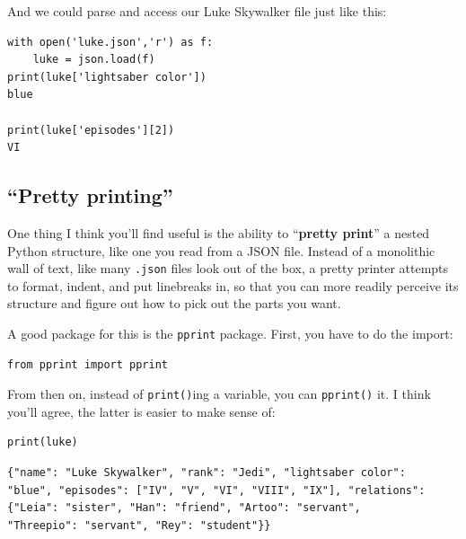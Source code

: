 And we could parse and access our Luke Skywalker file just like this:

\begin{Verbatim}[fontsize=\small,samepage=true,frame=single,framesep=3mm]
with open('luke.json','r') as f:
    luke = json.load(f)
print(luke['lightsaber color'])
blue

print(luke['episodes'][2])
VI
\end{Verbatim}

\normalsize

\subsection{``Pretty printing''}


One thing I think you'll find useful is the ability to ``\textbf{pretty
print}'' a nested Python structure, like one you read from a JSON file. Instead
of a monolithic wall of text, like many \texttt{.json} files look out of the
box, a pretty printer attempts to format, indent, and put linebreaks in, so
that you can more readily perceive its structure and figure out how to pick out
the parts you want.

A good package for this is the \texttt{pprint} package. First, you have to do
the import:


\vspace{-.15in}
\begin{Verbatim}[fontsize=\small,samepage=true,frame=single,framesep=3mm]
from pprint import pprint
\end{Verbatim}
\vspace{-.15in}


From then on, instead of \texttt{print()}ing a variable, you can
\texttt{pprint()} it. I think you'll agree, the latter is easier to make sense
of:

\begin{Verbatim}[fontsize=\small,samepage=true,frame=single,framesep=3mm]
print(luke)
\end{Verbatim}
\vspace{-.2in}

\begin{Verbatim}[fontsize=\footnotesize,samepage=true,frame=leftline,framesep=5mm,framerule=1mm]
{"name": "Luke Skywalker", "rank": "Jedi", "lightsaber color":
"blue", "episodes": ["IV", "V", "VI", "VIII", "IX"], "relations":
{"Leia": "sister", "Han": "friend", "Artoo": "servant",
"Threepio": "servant", "Rey": "student"}}
\end{Verbatim}

